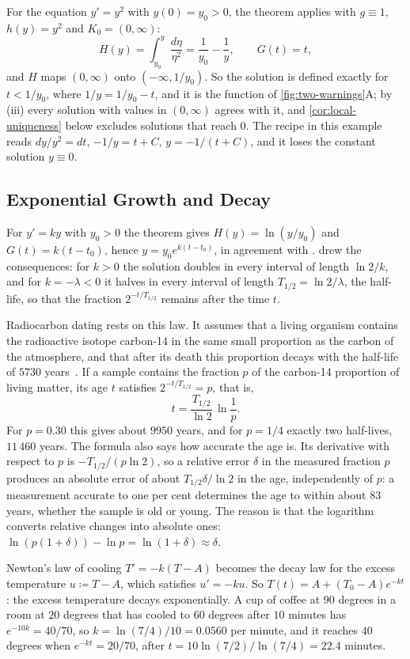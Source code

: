For the equation $y'=y^2$ with $y(0)=y_0>0$, the theorem applies with $g\equiv1$, $h(y)=y^2$ and $K_0=(0,\infty)$:
\[
H(y)=\int_{y_0}^y\frac{d\eta}{\eta^2}=\frac1{y_0}-\frac1y,\qquad G(t)=t ,
\]
and $H$ maps $(0,\infty)$ onto $(-\infty,1/y_0)$. So the solution is defined exactly for $t<1/y_0$, where $1/y=1/y_0-t$, and it is the function of \cref{fig:two-warnings}A; by (iii) every solution with values in $(0,\infty)$ agrees with it, and \cref{cor:local-uniqueness} below excludes solutions that reach $0$. The recipe in this example reads $dy/y^2=dt$, $-1/y=t+C$, $y=-1/(t+C)$, and it loses the constant solution $y\equiv0$.

\subsection{Exponential Growth and Decay}

For $y'=ky$ with $y_0>0$ the theorem gives $H(y)=\ln(y/y_0)$ and $G(t)=k(t-t_0)$, hence $y=y_0e^{k(t-t_0)}$, in agreement with .  drew the consequences: for $k>0$ the solution doubles in every interval of length $\ln2/k$, and for $k=-\lambda<0$ it halves in every interval of length $T_{1/2}=\ln2/\lambda$, the half-life, so that the fraction $2^{-t/T_{1/2}}$ remains after the time $t$.

Radiocarbon dating rests on this law. It assumes that a living organism contains the radioactive isotope carbon-14 in the same small proportion as the carbon of the atmosphere, and that after its death this proportion decays with the half-life of $5730$ years~\cite{godwin1962}. If a sample contains the fraction $p$ of the carbon-14 proportion of living matter, its age $t$ satisfies $2^{-t/T_{1/2}}=p$, that is,
\[
t=\frac{T_{1/2}}{\ln2}\,\ln\frac1p .
\]
For $p=0.30$ this gives about $9950$ years, and for $p=1/4$ exactly two half-lives, $11\,460$ years. The formula also says how accurate the age is. Its derivative with respect to $p$ is $-T_{1/2}/(p\ln2)$, so a relative error $\delta$ in the measured fraction $p$ produces an absolute error of about $T_{1/2}\delta/\ln2$ in the age, independently of $p$: a measurement accurate to one per cent determines the age to within about $83$ years, whether the sample is old or young. The reason is that the logarithm converts relative changes into absolute ones: $\ln(p(1+\delta))-\ln p=\ln(1+\delta)\approx\delta$.

Newton's law of cooling $T'=-k(T-A)$ becomes the decay law for the excess temperature $u\coloneqq T-A$, which satisfies $u'=-ku$. So $T(t)=A+(T_0-A)e^{-kt}$: the excess temperature decays exponentially. A cup of coffee at $90$ degrees in a room at $20$ degrees that has cooled to $60$ degrees after $10$ minutes has $e^{-10k}=40/70$, so $k=\ln(7/4)/10=0.0560$ per minute, and it reaches $40$ degrees when $e^{-kt}=20/70$, after $t=10\ln(7/2)/\ln(7/4)=22.4$ minutes.

